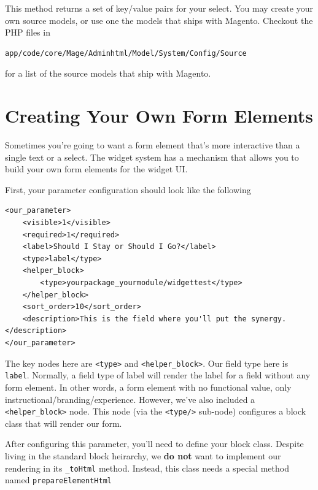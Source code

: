\documentclass[oneside]{book}
\begin{document}
This method returns a set of key/value pairs for your select. You may create your own source models, or use one the models that ships with Magento.  Checkout the PHP files in

\begin{lstlisting}
app/code/core/Mage/Adminhtml/Model/System/Config/Source

\end{lstlisting}


for a list of the source models that ship with Magento.

\section{Creating Your Own Form Elements}

Sometimes you're going to want a form element that's more interactive than a single text or a select.  The widget system has a mechanism that allows you to build your own form elements for the widget UI.

First, your parameter configuration should look like the following

\begin{lstlisting}
<our_parameter>
    <visible>1</visible>
    <required>1</required>
    <label>Should I Stay or Should I Go?</label>
    <type>label</type>
    <helper_block>
        <type>yourpackage_yourmodule/widgettest</type>
    </helper_block>
    <sort_order>10</sort_order>
    <description>This is the field where you'll put the synergy.</description>
</our_parameter>

\end{lstlisting}


The key nodes here are \footnotesize\texttt{\textless type\textgreater } \normalsize  and \footnotesize\texttt{\textless helper\_block\textgreater }\normalsize.  Our field type here is \footnotesize\texttt{label}\normalsize.  Normally, a field type of label will render the label for a field without any form element.  In other words, a form element with no functional value, only instructional/branding/experience.  However, we've also included a \footnotesize\texttt{\textless helper\_block\textgreater } \normalsize  node.  This node (via the \footnotesize\texttt{\textless type/\textgreater } \normalsize  sub-node) configures a block class that will render our form.

After configuring this parameter, you'll need to define your block class.  Despite living in the standard block heirarchy, we \textbf{do not} want to implement our rendering in its \footnotesize\texttt{\_toHtml} \normalsize  method.  Instead, this class needs a special method named \footnotesize\texttt{prepareElementHtml} \normalsize
\end{document}

